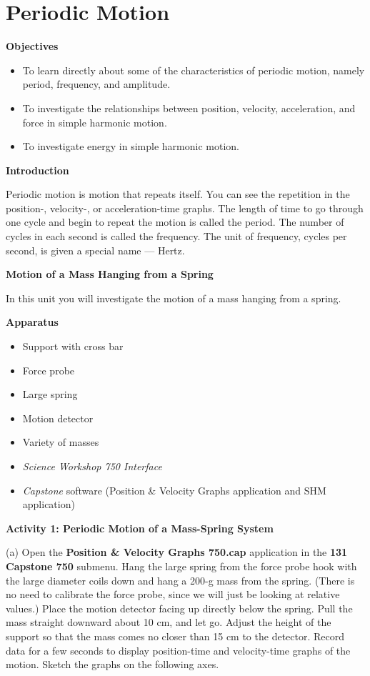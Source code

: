 \section{Periodic Motion}

\makelabheader %

{\bf Objectives }

\begin{itemize}
\item To learn directly about some of the characteristics of periodic motion, namely period, frequency, and amplitude. 
\item To investigate the relationships between position, velocity, acceleration, and force in simple harmonic motion. 
\item To investigate energy in simple harmonic motion.
\end{itemize}
\textbf{Introduction }

Periodic motion is motion that repeats itself. You can see the repetition in
the position-, velocity-, or acceleration-time graphs. The length of time to
go through one cycle and begin to repeat the motion is called the period. The
number of cycles in each second is called the frequency. The unit of frequency,
cycles per second, is given a special name --- Hertz.

\textbf{Motion of a Mass Hanging from a Spring} 

In this unit you will investigate the motion of a mass hanging from a spring.

\textbf{Apparatus} 

\begin{itemize}
\item Support with cross bar
\item Force probe
\item Large spring
\item Motion detector 
\item Variety of masses 
\item \textit{Science Workshop 750 Interface}
\item \textit{Capstone} software (Position \& Velocity Graphs application and SHM
application)
\end{itemize}
\textbf{Activity 1: Periodic Motion of a Mass-Spring System} 

(a) Open the \textbf{Position \& Velocity Graphs 750.cap} application in the \textbf{131 Capstone 750} submenu. Hang the large spring from the force probe hook with the large diameter coils down and hang a 200-g mass from the spring. (There is no need to calibrate the force probe, since we will just be looking at relative values.) Place the motion detector facing up directly below the spring. Pull the mass straight downward about 10 cm, and let go. 
Adjust the height of the support so that the mass comes no closer than 15 cm 
to the detector. Record data for a few seconds to display position-time and 
velocity-time graphs of the motion. Sketch the graphs on the following axes.

